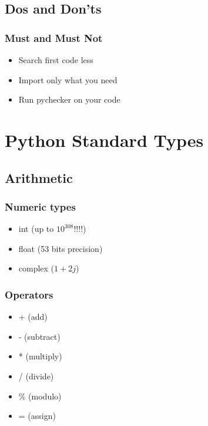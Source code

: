 \documentclass{beamer}
\begin{document}
\subsection{Dos and Don'ts}
\begin{frame}
	\frametitle{Must and Must Not}

\begin{itemize}
\item<1-> Search first code less
\item<2-> Import only what you need
\item<3-> Run pychecker on your code
\end{itemize}

\end{frame}

\section{Python Standard Types}
\subsection{Arithmetic}

\begin{frame}
\frametitle{Numeric types}
\begin{itemize}
\item<1-> int (up to $10^{308}$!!!!) 
\item<2-> float (53 bits precision)
\item<3-> complex ($1+2j$)
\end{itemize}
\end{frame}

\begin{frame}
\frametitle{Operators}
\begin{itemize}
\item<1-> + (add)
\item<2-> - (subtract)
\item<3-> * (multiply)
\item<4-> / (divide)
\item<5-> \% (modulo)
\item<6-> =	(assign)
\end{itemize}
\end{frame}
\end{document}
